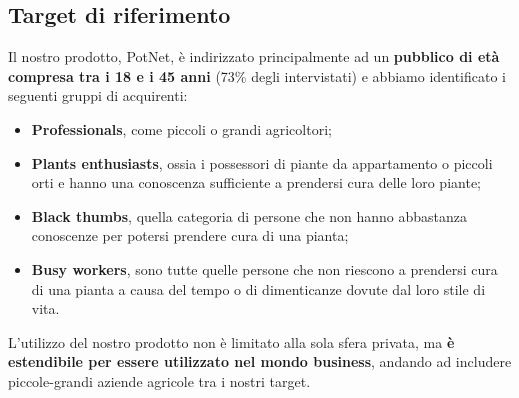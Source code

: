 \subsection{Target di riferimento}

Il nostro prodotto, PotNet, è indirizzato principalmente ad un \textbf{pubblico di età compresa tra i 18 e i 45 anni} (73\% degli intervistati) e abbiamo identificato i seguenti gruppi di acquirenti:

\begin{itemize}
	\item \textbf{Professionals}, come piccoli o grandi agricoltori;
	
	\item \textbf{Plants enthusiasts}, ossia i possessori di piante da appartamento o piccoli orti e hanno una conoscenza sufficiente a prendersi cura delle loro piante;	
	
	\item \textbf{Black thumbs}, quella categoria di persone che non hanno abbastanza conoscenze per potersi prendere cura di una pianta;
	
	\item \textbf{Busy workers}, sono tutte quelle persone che non riescono a prendersi cura di una pianta a causa del tempo o di dimenticanze dovute dal loro stile di vita.
\end{itemize}

L’utilizzo del nostro prodotto non è limitato alla sola sfera privata, ma \textbf{è estendibile per essere utilizzato nel mondo business}, andando ad includere piccole-grandi aziende agricole tra i nostri target.